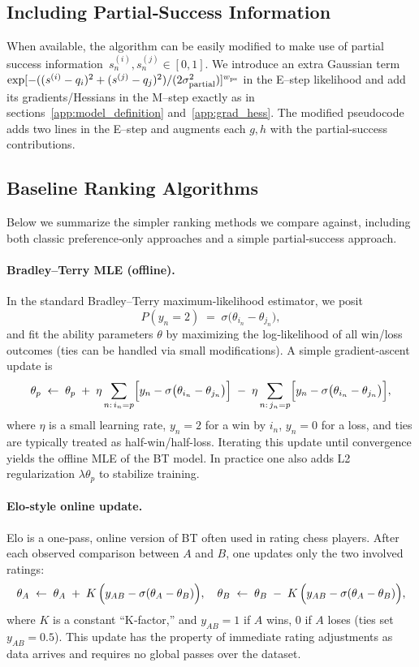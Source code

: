 \subsection{Including Partial‐Success Information}

When available, the algorithm can be easily modified to make use of partial success information 
\(\,s^{(i)}_n, s^{(j)}_n\in[0,1]\).  We introduce an extra Gaussian term
\(\exp[-((s^{(i)}-q_i)^2+(s^{(j)}-q_j)^2)/(2\sigma_{\rm partial}^2)]^{w_{\rm ps}}\)
in the E–step likelihood and add its gradients/Hessians in the M–step exactly as in sections~\ref{app:model_definition} and~\ref{app:grad_hess}.  The modified pseudocode adds two lines in the E–step and augments each \(g,h\) with the partial‐success contributions.

\subsection{Baseline Ranking Algorithms}
\label{app:baselines}

Below we summarize the simpler ranking methods we compare against, including both classic preference‐only approaches and a simple partial‐success approach.

\paragraph{Bradley–Terry MLE (offline).}  
In the standard Bradley–Terry maximum‐likelihood estimator, we posit
\[
  P(y_n=2)\;=\;\sigma\bigl(\theta_{i_n}-\theta_{j_n}\bigr),
\]
and fit the ability parameters \(\theta\) by maximizing the log‐likelihood of all win/loss outcomes (ties can be handled via small modifications).  A simple gradient‐ascent update is
\[
  \theta_p \;\gets\;
    \theta_p \;+\;\eta
    \sum_{n:\,i_n=p}\Bigl[y_n - \sigma\bigl(\theta_{i_n}-\theta_{j_n}\bigr)\Bigr]
    \;-\;
    \eta
    \sum_{n:\,j_n=p}\Bigl[y_n - \sigma\bigl(\theta_{i_n}-\theta_{j_n}\bigr)\Bigr],
\]
where \(\eta\) is a small learning rate, \(y_n=2\) for a win by \(i_n\), \(y_n=0\) for a loss, and ties are typically treated as half-win/half-loss.  Iterating this update until convergence yields the offline MLE of the BT model.  In practice one also adds L2 regularization \(\lambda\theta_p\) to stabilize training.

\newpage

\paragraph{Elo‐style online update.}  
Elo is a one‐pass, online version of BT often used in rating chess players.  After each observed comparison between \(A\) and \(B\), one updates only the two involved ratings:
\[
  \theta_A \;\gets\;
    \theta_A \;+\; K\,\Bigl(y_{AB} - \sigma(\theta_A-\theta_B)\Bigr),
  \quad
  \theta_B \;\gets\;
    \theta_B \;-\; K\,\Bigl(y_{AB} - \sigma(\theta_A-\theta_B)\Bigr),
\]
where \(K\) is a constant “K‐factor,” and \(y_{AB}=1\) if \(A\) wins, \(0\) if \(A\) loses (ties set \(y_{AB}=0.5\)).  This update has the property of immediate rating adjustments as data arrives and requires no global passes over the dataset.

